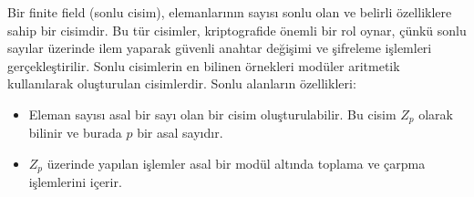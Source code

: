 Bir finite field (sonlu cisim), elemanlarının sayısı sonlu olan ve belirli özelliklere sahip bir cisimdir. Bu tür cisimler, kriptografide önemli bir rol oynar, çünkü sonlu sayılar üzerinde ilem yaparak güvenli anahtar değişimi ve şifreleme işlemleri gerçekleştirilir. Sonlu cisimlerin en bilinen örnekleri modüler aritmetik kullanılarak oluşturulan cisimlerdir. Sonlu alanların özellikleri:

\begin{itemize}
    \item Eleman sayısı asal bir sayı olan bir cisim oluşturulabilir. Bu cisim $Z_p$ olarak bilinir ve burada $p$ bir asal sayıdır.
    \item $Z_p$ üzerinde yapılan işlemler asal bir modül altında toplama ve çarpma işlemlerini içerir.
\end{itemize}

\newpage